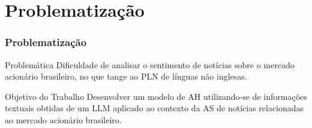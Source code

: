 \section{Problematização} %


\begin{frame}
	\frametitle{Problematização}

    \begin{alertblock}{Problemática}
    Dificuldade de analisar o sentimento de notícias sobre o mercado acionário brasileiro, no que tange ao PLN de línguas não inglesas.
    \end{alertblock}
    \bigskip
    \begin{block}{Objetivo do Trabalho}
     Desenvolver um modelo de AH utilizando-se de informações textuais obtidas de um LLM aplicado ao contexto da AS de notícias relacionadas ao mercado acionário brasileiro.
    \end{block}

	
\end{frame}

